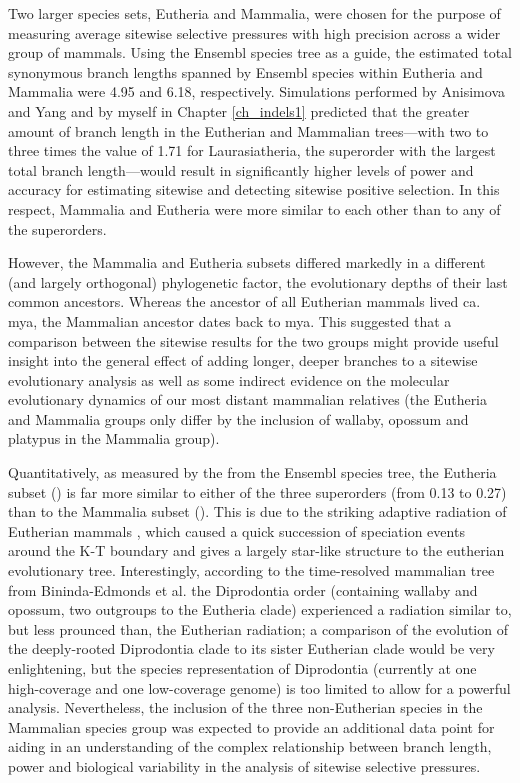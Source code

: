Two larger species sets, Eutheria and Mammalia, were chosen for the
purpose of measuring average sitewise selective pressures with high
precision across a wider group of mammals. Using the Ensembl species
tree as a guide, the estimated total synonymous branch lengths spanned
by Ensembl species within Eutheria and Mammalia were 4.95 and 6.18,
respectively. Simulations performed by Anisimova and Yang
\citeyearpar{todo, Anisimova Yang 2002} and by myself in Chapter
\ref{ch_indels1} predicted that the greater amount of branch length in the
Eutherian and Mammalian trees---with two to three times the value of
1.71 for Laurasiatheria, the superorder with the largest total branch
length---would result in significantly higher levels of power and
accuracy for estimating sitewise \omg and detecting sitewise positive
selection. In this respect, Mammalia and Eutheria were more similar to
each other than to any of the superorders.

However, the Mammalia and Eutheria subsets differed markedly in a
different (and largely orthogonal) phylogenetic factor, the
evolutionary depths of their last common ancestors. Whereas the
ancestor of all Eutherian mammals lived ca.  mya, the
Mammalian ancestor dates back to  mya. This suggested that a
comparison between the sitewise results for the two groups might
provide useful insight into the general effect of adding longer,
deeper branches to a sitewise evolutionary analysis as well as some
indirect evidence on the molecular evolutionary dynamics of our most
distant mammalian relatives (the Eutheria and Mammalia groups only
differ by the inclusion of wallaby, opossum and platypus in the
Mammalia group).

Quantitatively, as measured by the \mpl from the Ensembl species tree,
the Eutheria subset () is far more similar to either of the
three superorders (\mpl from 0.13 to 0.27) than to the Mammalia subset
(). This is due to the striking adaptive radiation of
Eutherian mammals \citep{Archibald1999,BinindaEmonds2007}, which
caused a quick succession of speciation events around the K-T boundary
and gives a largely star-like structure to the eutherian evolutionary
tree. Interestingly, according to the time-resolved mammalian tree
from Bininda-Edmonds et al. \citeyearpar{BinindaEmonds2007} the
Diprodontia order (containing wallaby and opossum, two outgroups to
the Eutheria clade) experienced a radiation similar to, but less
prounced than, the Eutherian radiation; a comparison of the evolution
of the deeply-rooted Diprodontia clade to its sister Eutherian clade
would be very enlightening, but the species representation of
Diprodontia (currently at one high-coverage and one low-coverage
genome) is too limited to allow for a powerful analysis. Nevertheless,
the inclusion of the three non-Eutherian species in the Mammalian
species group was expected to provide an additional data point for
aiding in an understanding of the complex relationship between branch
length, power and biological variability in the analysis of sitewise
selective pressures.

